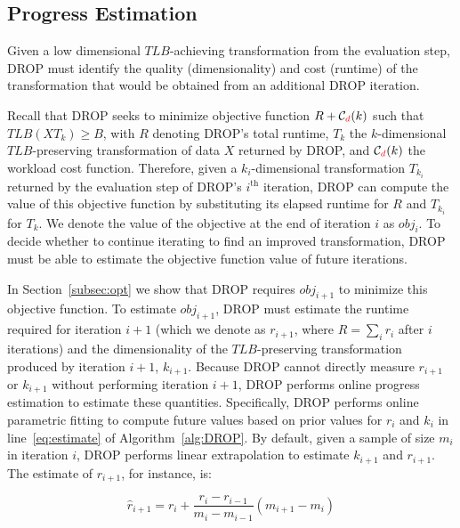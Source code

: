 \subsection{Progress Estimation}
\label{subsec:pest}
Given a low dimensional $TLB$-achieving transformation from the evaluation step, DROP must identify the quality (dimensionality) and cost (runtime) of the transformation that would be obtained from an additional DROP iteration.

Recall that DROP seeks to minimize objective function $R + \mathcal{C}_{\color{red}d}(k)$ such that $TLB(XT_k) \geq B$, with $R$ denoting DROP's total runtime, $T_k$ the $k$-dimensional $TLB$-preserving transformation of data $X$ returned by DROP, and $\mathcal{C}_{\color{red}d}(k)$ the workload cost function. 
Therefore, given a $k_i$-dimensional transformation $T_{k_i}$ returned by the evaluation step of DROP's $i^{\text{th}}$ iteration, DROP can compute the value of this objective function by substituting its elapsed runtime for $R$ and $T_{k_i}$ for $T_k$.  
We denote the value of the objective at the end of iteration $i$ as $obj_i$. 
To decide whether to continue iterating to find an improved transformation, DROP must be able to estimate the objective function value of future iterations.

In Section~\ref{subsec:opt} we show that DROP requires $obj_{i+1}$ to minimize this objective function.
To estimate $obj_{i+1}$, DROP must estimate the runtime required for iteration $i+1$ (which we denote as $r_{i+1}$, where $R=\sum_i r_i$ after $i$ iterations) and the dimensionality of the $TLB$-preserving transformation produced by iteration $i+1$, $k_{i+1}$. 
Because DROP cannot directly measure $r_{i+1}$ or $k_{i+1}$ without performing iteration $i+1$, DROP performs online progress estimation to estimate these quantities. Specifically, DROP performs online parametric fitting to compute future values based on prior values for $r_{i}$ and $k_i$ in line~\ref{eq:estimate} of Algorithm~\ref{alg:DROP}. 
By default, given a sample of size $m_i$ in iteration $i$, DROP performs linear extrapolation to estimate $k_{i+1}$ and $r_{i+1}$. The estimate of $r_{i+1}$, for instance, is:

\vspace{-.4cm}
\begin{equation*}
\hat{r}_{i+1} = r_i + \frac{r_i - r_{i-1}}{m_i - m_{i-1}} (m_{i+1} -  m_i)
\end{equation*}



